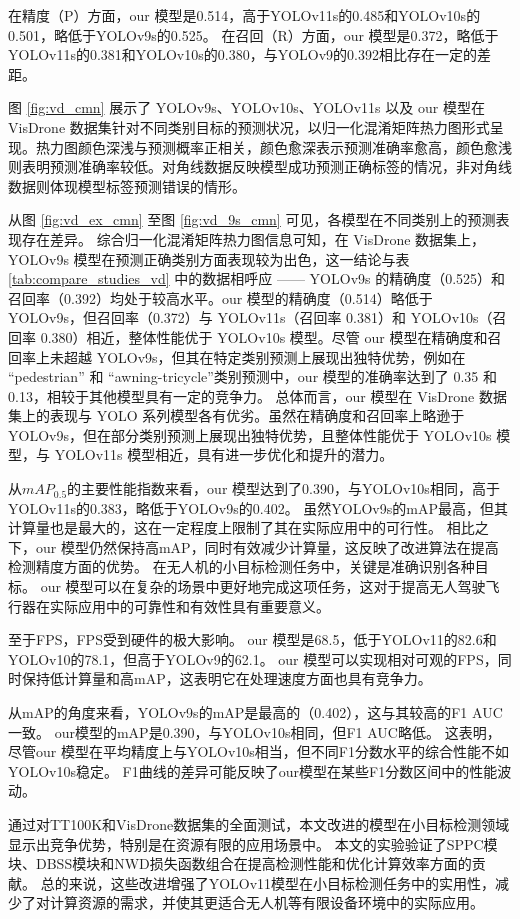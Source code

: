 在精度（P）方面，our 模型是0.514，高于YOLOv11s的0.485和YOLOv10s的0.501，略低于YOLOv9s的0.525。 在召回（R）方面，our 模型是0.372，略低于YOLOv11s的0.381和YOLOv10s的0.380，与YOLOv9的0.392相比存在一定的差距。

图 \ref{fig:vd_cmn} 展示了 YOLOv9s、YOLOv10s、YOLOv11s 以及 our 模型在 VisDrone 数据集针对不同类别目标的预测状况，以归一化混淆矩阵热力图形式呈现。热力图颜色深浅与预测概率正相关，颜色愈深表示预测准确率愈高，颜色愈浅则表明预测准确率较低。对角线数据反映模型成功预测正确标签的情况，非对角线数据则体现模型标签预测错误的情形。

从图 \ref{fig:vd_ex_cmn} 至图 \ref{fig:vd_9s_cmn} 可见，各模型在不同类别上的预测表现存在差异。
综合归一化混淆矩阵热力图信息可知，在 VisDrone 数据集上，YOLOv9s 模型在预测正确类别方面表现较为出色，这一结论与表 \ref{tab:compare_studies_vd} 中的数据相呼应 —— YOLOv9s 的精确度（0.525）和召回率（0.392）均处于较高水平。our 模型的精确度（0.514）略低于 YOLOv9s，但召回率（0.372）与 YOLOv11s（召回率 0.381）和 YOLOv10s（召回率 0.380）相近，整体性能优于 YOLOv10s 模型。尽管 our 模型在精确度和召回率上未超越 YOLOv9s，但其在特定类别预测上展现出独特优势，例如在 “pedestrian” 和 “awning-tricycle”类别预测中，our 模型的准确率达到了 0.35 和 0.13，相较于其他模型具有一定的竞争力。
总体而言，our 模型在 VisDrone 数据集上的表现与 YOLO 系列模型各有优劣。虽然在精确度和召回率上略逊于 YOLOv9s，但在部分类别预测上展现出独特优势，且整体性能优于 YOLOv10s 模型，与 YOLOv11s 模型相近，具有进一步优化和提升的潜力。

从$mAP_{0.5}$的主要性能指数来看，our 模型达到了0.390，与YOLOv10s相同，高于YOLOv11s的0.383，略低于YOLOv9s的0.402。 虽然YOLOv9s的mAP最高，但其计算量也是最大的，这在一定程度上限制了其在实际应用中的可行性。 相比之下，our 模型仍然保持高mAP，同时有效减少计算量，这反映了改进算法在提高检测精度方面的优势。 在无人机的小目标检测任务中，关键是准确识别各种目标。 our 模型可以在复杂的场景中更好地完成这项任务，这对于提高无人驾驶飞行器在实际应用中的可靠性和有效性具有重要意义。

至于FPS，FPS受到硬件的极大影响。 our 模型是68.5，低于YOLOv11的82.6和YOLOv10的78.1，但高于YOLOv9的62.1。 our 模型可以实现相对可观的FPS，同时保持低计算量和高mAP，这表明它在处理速度方面也具有竞争力。

从mAP的角度来看，YOLOv9s的mAP是最高的（0.402），这与其较高的F1 AUC一致。 our模型的mAP是0.390，与YOLOv10s相同，但F1 AUC略低。 这表明，尽管our 模型在平均精度上与YOLOv10s相当，但不同F1分数水平的综合性能不如YOLOv10s稳定。 F1曲线的差异可能反映了our模型在某些F1分数区间中的性能波动。

通过对TT100K和VisDrone数据集的全面测试，本文改进的模型在小目标检测领域显示出竞争优势，特别是在资源有限的应用场景中。 本文的实验验证了SPPC模块、DBSS模块和NWD损失函数组合在提高检测性能和优化计算效率方面的贡献。 总的来说，这些改进增强了YOLOv11模型在小目标检测任务中的实用性，减少了对计算资源的需求，并使其更适合无人机等有限设备环境中的实际应用。

